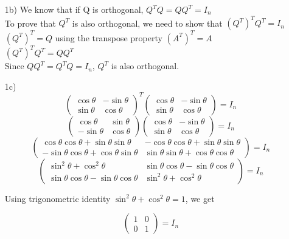 \documentclass{article}
\begin{document}
\begin{enumerate}
    \item[1b)] We know that if Q is orthogonal, $Q^TQ = QQ^T = I_n$\\
    To prove that $Q^T$ is also orthogonal, we need to show that $(Q^T)^TQ^T = I_n$\\
    $(Q^T)^T = Q$ using the transpose property $(A^T)^T = A$\\
    $(Q^T)^TQ^T = QQ^T$ \\
    Since $QQ^T = Q^TQ = I_n$, $Q^T$ is also orthogonal.
    \item[1c)]
    $$
    \begin{pmatrix}
    \cos\theta & -\sin\theta \\
    \sin\theta & \cos\theta
    \end{pmatrix}^T
    \begin{pmatrix}
    \cos\theta & -\sin\theta \\
    \sin\theta & \cos\theta
    \end{pmatrix}
    = I_n
    $$
    $$
    \begin{pmatrix}
    \cos\theta & \sin\theta \\
    -\sin\theta & \cos\theta
    \end{pmatrix}
    \begin{pmatrix}
    \cos\theta & -\sin\theta \\
    \sin\theta & \cos\theta
    \end{pmatrix} = I_n
    $$
    $$
    \begin{pmatrix}
        \cos\theta\cos\theta + \sin\theta\sin\theta & -\cos\theta\cos\theta + \sin\theta\sin\theta \\
        -\sin\theta\cos\theta + \cos\theta\sin\theta & \sin\theta\sin\theta + \cos\theta\cos\theta
    \end{pmatrix} = I_n
    $$
    $$
    \begin{pmatrix}
        \sin^2\theta + \cos^2\theta & \sin\theta\cos\theta - \sin\theta\cos\theta \\
        \sin\theta\cos\theta - \sin\theta\cos\theta & \sin^2\theta + \cos^2\theta
    \end{pmatrix} = I_n
    $$
    
    Using trigonometric identity $\sin^2\theta + \cos^2\theta = 1$, we get
    
    $$
    \begin{pmatrix}
        1 & 0 \\
        0 & 1 
    \end{pmatrix} = I_n
    $$


\end{enumerate}
\end{document}
